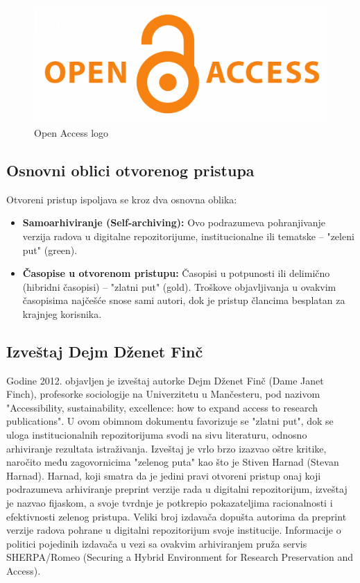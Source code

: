 \documentclass{article}
\begin{document}
\begin{figure}[htbp]
    \center
    \includegraphics[scale=0.15]{img/open-access-logo.png}
    \caption{Open Access logo}
\end{figure}

\subsection{Osnovni oblici otvorenog pristupa}

Otvoreni pristup ispoljava se kroz dva osnovna oblika:

\begin{itemize}
    \item \textbf{Samoarhiviranje (Self-archiving):} Ovo podrazumeva pohranjivanje verzija radova u digitalne repozitorijume, institucionalne ili tematske – "zeleni put" (green).
    \item \textbf{Časopise u otvorenom pristupu:} Časopisi u potpunosti ili delimično (hibridni časopisi) – "zlatni put" (gold). Troškove objavljivanja u ovakvim časopisima najčešće snose sami autori, dok je pristup člancima besplatan za krajnjeg korisnika.
\end{itemize}

\subsection{Izveštaj Dejm Dženet Finč}

Godine 2012. objavljen je izveštaj autorke Dejm Dženet Finč (Dame Janet Finch), profesorke sociologije na Univerzitetu u Mančesteru, pod nazivom "Accessibility, sustainability, excellence: how to expand access to research publications". U ovom obimnom dokumentu favorizuje se "zlatni put", dok se uloga institucionalnih repozitorijuma svodi na sivu literaturu, odnosno arhiviranje rezultata istraživanja. Izveštaj je vrlo brzo izazvao oštre kritike, naročito među zagovornicima "zelenog puta" kao što je Stiven Harnad (Stevan Harnad). Harnad, koji smatra da je jedini pravi otvoreni pristup onaj koji podrazumeva arhiviranje preprint verzije rada u digitalni repozitorijum, izveštaj je nazvao fijaskom, a svoje tvrdnje je potkrepio pokazateljima racionalnosti i efektivnosti zelenog pristupa. Veliki broj izdavača dopušta autorima da preprint verzije radova pohrane u digitalni repozitorijum svoje institucije. Informacije o politici pojedinih izdavača u vezi sa ovakvim arhiviranjem pruža servis SHERPA/Romeo (Securing a Hybrid Environment for Research Preservation and Access).
\end{document}
